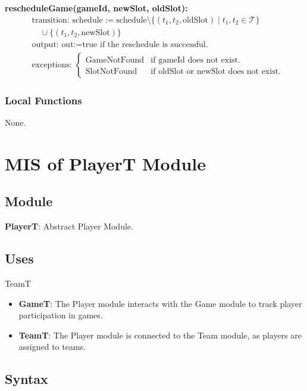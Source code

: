 \documentclass[12pt, titlepage]{article}
\begin{document}
\vspace{1em}

\noindent \textbf{rescheduleGame(gameId, newSlot, oldSlot):}
\begin{align*}
   & \text{transition: } \text{schedule} := \text{schedule} \setminus \{(t_1, t_2, \text{oldSlot}) \;|\; t_1, t_2 \in \mathcal{T}\} \\
   & \quad \cup \{(t_1, t_2, \text{newSlot})\}                                                                                      \\
   & \text{output: } \text{out} := \text{true if the reschedule is successful.}                                                     \\
   & \text{exceptions: }
  \begin{cases}
    \text{GameNotFound} & \text{if gameId does not exist.}             \\
    \text{SlotNotFound} & \text{if oldSlot or newSlot does not exist.}
  \end{cases}
\end{align*}

\subsubsection{Local Functions}
None.


\newpage

\section{MIS of PlayerT Module} \label{PlayerTModule}

\subsection{Module}
\textbf{PlayerT}: Abstract Player Module.
\subsection{Uses}
TeamT
\begin{itemize}
  \item \textbf{GameT}: The Player module interacts with the Game module to track player participation in games.
  \item \textbf{TeamT}: The Player module is connected to the Team module, as players are assigned to teams.
\end{itemize}

\subsection{Syntax}
\end{document}
